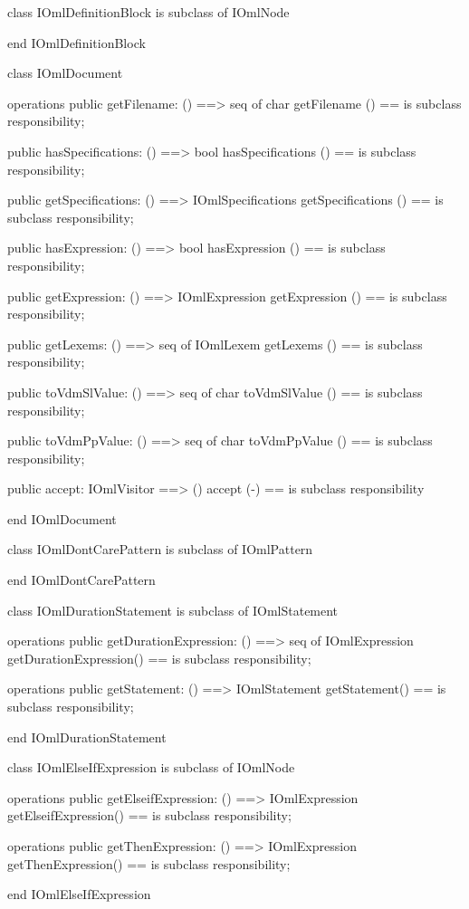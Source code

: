 \begin{vdm_al}
class IOmlDefinitionBlock
 is subclass of IOmlNode

end IOmlDefinitionBlock
\end{vdm_al}

\begin{vdm_al}
class IOmlDocument

operations
  public getFilename: () ==> seq of char
  getFilename () == is subclass responsibility;

  public hasSpecifications: () ==> bool
  hasSpecifications () == is subclass responsibility;

  public getSpecifications: () ==> IOmlSpecifications
  getSpecifications () == is subclass responsibility;

  public hasExpression: () ==> bool
  hasExpression () == is subclass responsibility;

  public getExpression: () ==> IOmlExpression
  getExpression () == is subclass responsibility;

  public getLexems: () ==> seq of IOmlLexem
  getLexems () == is subclass responsibility;

  public toVdmSlValue: () ==> seq of char
  toVdmSlValue () == is subclass responsibility;

  public toVdmPpValue: () ==> seq of char
  toVdmPpValue () == is subclass responsibility;

  public accept: IOmlVisitor ==> ()
  accept (-) == is subclass responsibility

end IOmlDocument
\end{vdm_al}
\begin{vdm_al}
class IOmlDontCarePattern
 is subclass of IOmlPattern

end IOmlDontCarePattern
\end{vdm_al}

\begin{vdm_al}
class IOmlDurationStatement
 is subclass of IOmlStatement

operations
  public getDurationExpression: () ==> seq of IOmlExpression
  getDurationExpression() == is subclass responsibility;

operations
  public getStatement: () ==> IOmlStatement
  getStatement() == is subclass responsibility;

end IOmlDurationStatement
\end{vdm_al}

\begin{vdm_al}
class IOmlElseIfExpression
 is subclass of IOmlNode

operations
  public getElseifExpression: () ==> IOmlExpression
  getElseifExpression() == is subclass responsibility;

operations
  public getThenExpression: () ==> IOmlExpression
  getThenExpression() == is subclass responsibility;

end IOmlElseIfExpression
\end{vdm_al}

